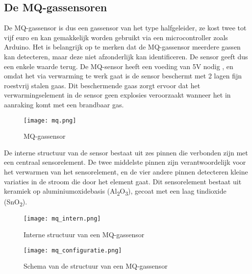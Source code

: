 \subsection{De MQ-gassensoren}%
\label{subsec:werking-MQ}


De MQ-gassensor is dus een gassensor van het type halfgeleider, ze kost twee tot vijf euro en kan gemakkelijk worden gebruikt via een microcontroller zoals Arduino. Het is belangrijk op te merken dat de MQ-gassensor meerdere gassen kan detecteren, maar deze niet afzonderlijk kan identificeren. De sensor geeft dus een enkele waarde terug.
De MQ-sensor heeft een voeding van 5V nodig
, en omdat het via verwarming te werk gaat is de sensor beschermt met 2 lagen fijn roestvrij stalen gaas. Dit beschermende gaas zorgt ervoor dat het verwarmingselement in de sensor geen explosies veroorzaakt wanneer het in aanraking komt met een brandbaar gas.

\begin{figure}[h]
    \texttt{[image: mq.png]}
    \caption[MQ-gassensor]{MQ-gassensor}
    \label{fig:mq}
\end{figure}

De interne structuur van de sensor bestaat uit zes pinnen die verbonden zijn met een centraal sensorelement. De twee middelste pinnen zijn verantwoordelijk voor het verwarmen van het sensorelement, en de vier andere pinnen detecteren kleine variaties in de stroom die door het element gaat. Dit sensorelement bestaat uit keramiek op aluminiumoxidebasis (Al\textsubscript{2}O\textsubscript{3}), gecoat met een laag tindioxide (SnO\textsubscript{2}).

\begin{figure}[h]
    \texttt{[image: mq\_intern.png]}
    \caption[Structuur MQ-gassensor]{Interne structuur van een MQ-gassensor}
    \label{fig:mq_intern}
\end{figure}

\begin{figure}[h]
    \texttt{[image: mq\_configuratie.png]}
    \caption[Schema MQ-gassensor]{Schema van de structuur van een MQ-gassensor
    }
    \label{fig:mq_configuratie}
\end{figure}

